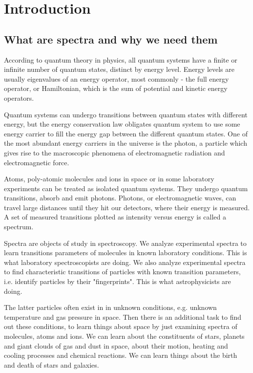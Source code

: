 \section{Introduction}
\subsection{What are spectra and why we need them}

According to quantum theory in physics, all quantum systems have a finite or infinite number of quantum states, distinct by energy level. Energy levels are usually eigenvalues of an energy operator, most commonly - the full energy operator, or Hamiltonian, which is the sum of potential and kinetic energy operators.

Quantum systems can undergo transitions between quantum states with different energy, but the energy conservation law obligates quantum system to use some energy carrier to fill the energy gap between the different quantum states. One of the most abundant energy carriers in the universe is the photon, a particle which gives rise to the macroscopic phenomena of electromagnetic radiation and electromagnetic force.

Atoms, poly-atomic molecules and ions in space or in some laboratory experiments can be treated as isolated quantum systems. They undergo quantum transitions, absorb and emit photons. Photons, or electromagnetic waves, can travel large distances until they hit our detectors, where their energy is measured. A set of measured transitions plotted as intensity versus energy is called a spectrum. 

Spectra are objects of study in spectroscopy. We analyze experimental spectra to learn transitions parameters of molecules in known laboratory conditions. This is what laboratory spectroscopists are doing. We also analyze experimental spectra to find characteristic transitions of particles with known transition parameters, i.e. identify particles by their "fingerprints". This is what astrophysicists are doing. 

The latter particles often exist in in unknown conditions, e.g. unknown temperature and gas pressure in space. Then there is an additional task to find out these conditions, to learn things about space by just examining spectra of molecules, atoms and ions. We can learn about the constituents of stars, planets and giant clouds of gas and dust in space, about their motion, heating and cooling processes and chemical reactions. We can learn things about the birth and death of stars and galaxies.

